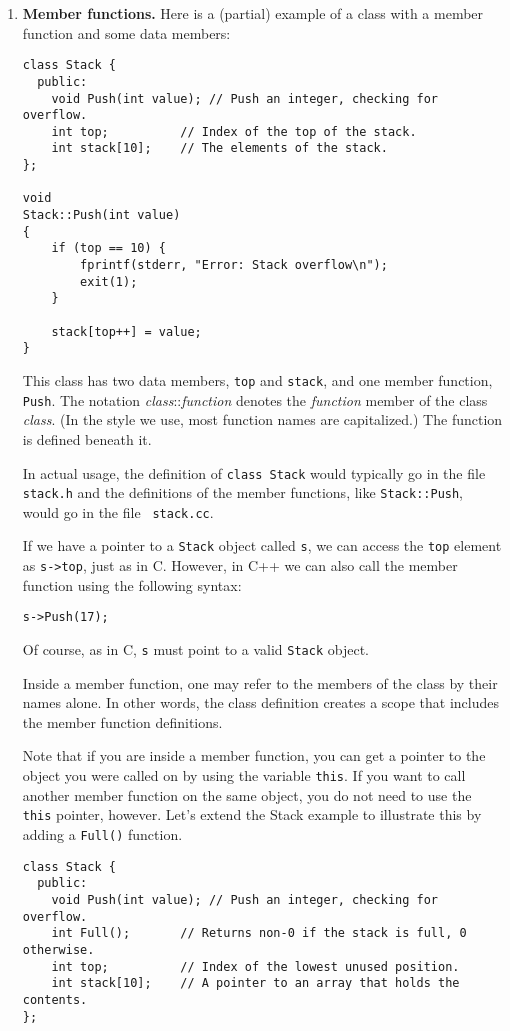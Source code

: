 \begin{enumerate}
\item {\bf Member functions.}   Here is a (partial) example of a class
with a member function and some data members:
\begin{verbatim}
class Stack {
  public:
    void Push(int value); // Push an integer, checking for overflow.
    int top;          // Index of the top of the stack.
    int stack[10];    // The elements of the stack.
};

void
Stack::Push(int value)
{
    if (top == 10) {
        fprintf(stderr, "Error: Stack overflow\n");
        exit(1);
    }
    
    stack[top++] = value;
}
\end{verbatim}
This class has two data members, {\tt top} and {\tt stack}, and one
member function,
{\tt Push}.  The notation {\em class}::{\em function} denotes the
{\em function} member of the class {\em class}.  (In the style we use,
most function names are capitalized.)  The function is defined beneath
it.

In actual usage, the definition of {\tt class Stack} would typically
go in the file {\tt stack.h} and the definitions of the member
functions, like {\tt Stack::Push}, would go in the file {\tt
stack.cc}.

If we have a pointer to a {\tt Stack} object called {\tt s}, we can
access the {\tt top} element as {\tt s->top}, just as in C.  However,
in C++ we can also call the member function using the following syntax:
\begin{verbatim}
s->Push(17);
\end{verbatim}
Of course, as in C, {\tt s} must point to a valid {\tt Stack} object.

Inside a member function, one may refer to the members of the class
by their names alone.  In other words, the class definition
creates a scope that includes the member function definitions.

Note that if you are inside a member function, you can get a pointer
to the object you were called on by using the variable {\tt this}.
If you want to call another member function on the same object, you
do not need to use the {\tt this} pointer, however.  Let's extend the Stack
example to illustrate this by adding a {\tt Full()} function.
\begin{verbatim}
class Stack {
  public:
    void Push(int value); // Push an integer, checking for overflow.
    int Full();       // Returns non-0 if the stack is full, 0 otherwise.
    int top;          // Index of the lowest unused position.
    int stack[10];    // A pointer to an array that holds the contents.
};


\end{verbatim}
\end{enumerate}
